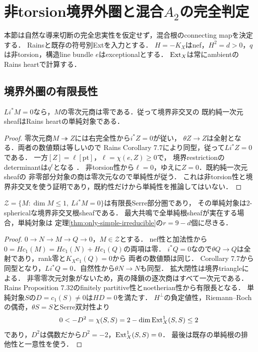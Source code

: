 \section{非torsion境界外圏と混合\texorpdfstring{$A_2$}{A2}の完全判定}
\label{sec:mixed-a2-category}
本節は自然な導来切断の完全忠実性を仮定せず，混合根のconnecting mapを決定する．
Rains\cite[Corollaries 7.7, 7.13, 7.15, Propositions 7.6, 7.32,
Corollary 10.12, Proposition 10.13]{RainsBirational}と既存の符号別Extを入力とする．
$H=-K_X$はnef，$H^2=d>0$，$q$は非torsion，構造line bundle $e$はexceptionalとする．
$\operatorname{Ext}_X$は常にambientのRains heartで計算する．

\subsection{境界外圏の有限長性}
\begin{lemma}[零次元の境界外商の排除]
\label{lem:offboundary-no-points}
$Li^*M=0$なら，$M$の零次元商は零である．従って境界非交叉の
既約純一次元sheafはRains heartの単純対象である．
\end{lemma}
\begin{proof}
零次元商$M\twoheadrightarrow Z$には右完全性から$i^*Z=0$が従い，
$\theta Z\to Z$は全射となる．両者の数値類は等しいので
Rains Corollary 7.7により同型，従って$Li^*Z=0$である．
一方$[Z]=\ell[\mathrm{pt}]$，$\ell=\chi(e,Z)\ge0$で，
境界restrictionのdeterminantは$q^\ell$となる
\cite[Proposition 7.6, Proposition 7.24直前]{RainsBirational}．
非torsion性から$\ell=0$，ゆえに$Z=0$．既約純一次元sheafの
非零部分対象の商は零次元なので単純性が従う．
これは非torsion性と境界非交叉を使う証明であり，既約性だけから単純性を推論してはいない．
\end{proof}

\begin{proposition}[境界外Serre部分圏]
\label{prop:offboundary-serre-length}
$\mathcal Z=\{M:\dim M\le1,\ Li^*M=0\}$は有限長Serre部分圏であり，
その単純対象は2-sphericalな境界非交叉根sheafである．
最大共鳴で全単純根sheafが実在する場合，単純対象は
定理\ref{thm:only-simple-irreducible}の$r=9-d$個に尽きる．
\end{proposition}
\begin{proof}
$0\to N\to M\to Q\to0$，$M\in\mathcal Z$とする．
nef性と加法性から$0=Hc_1(M)=Hc_1(N)+Hc_1(Q)$の両項は零．
$i^*Q=0$なので$\theta Q\to Q$は全射であり，rank零と$K_Xc_1(Q)=0$から
両者の数値類は同じ\cite[Corollary 7.15]{RainsBirational}．
Corollary 7.7から同型となり，$Li^*Q=0$．自然性から$\theta N\to N$も同型．
拡大閉性は境界triangleによる．
非零零次元対象がないため，真の降鎖の逐次商はすべて一次元である．
Rains Proposition 7.32のfinitely partitive性とnoetherian性から有限長となる．
単純対象$S$の$D=c_1(S)\ne0$は$HD=0$を満たす．
$H^\perp$の負定値性，Riemann--Rochの偶奇，$\theta S=S$とSerre双対性より
\[
0<-D^2=\chi(S,S)=2-\dim\operatorname{Ext}_X^1(S,S)\le2
\]
であり，$D^2$は偶数だから$D^2=-2$，$\operatorname{Ext}_X^1(S,S)=0$．
最後は既存の単純根の排他性と一意性を使う．
\end{proof}


